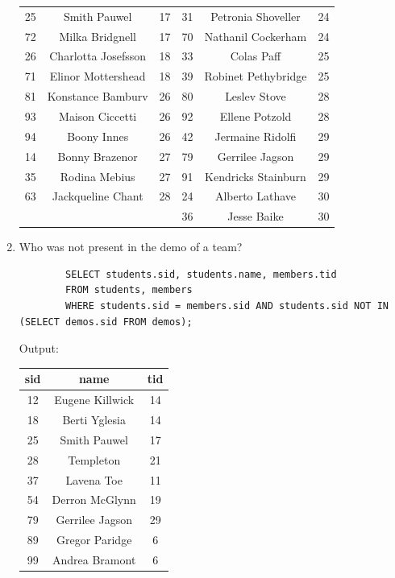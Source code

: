 \documentclass[11pt,letterpaper]{article}
\begin{document}
\begin{enumerate}
\begin{center}
\begin{tabular}{ | c  c  c |  c c c | }
				25 & Smith Pauwel & 17 & 31 & Petronia Shoveller & 24 \\
				72 & Milka Bridgnell & 17 & 70 & Nathanil Cockerham & 24 \\
				26 & Charlotta Josefsson & 18 & 33 & Colas Paff & 25 \\
				71 & Elinor Mottershead & 18 & 39 & Robinet Pethybridge & 25 \\
				\hline
				\hline
				81 & Konstance Bamburv & 26 & 80 & Leslev Stove & 28 \\
				93 & Maison Ciccetti & 26 & 92 & Ellene Potzold & 28 \\
				94 & Boony Innes & 26 & 42 & Jermaine Ridolfi & 29 \\
				14 & Bonny Brazenor & 27 & 79 & Gerrilee Jagson & 29 \\
				35 & Rodina Mebius & 27 & 91 & Kendricks Stainburn & 29 \\
				63 & Jackqueline Chant & 28 & 24 & Alberto Lathave & 30 \\
				& & & 36 & Jesse Baike & 30 \\
				\hline
			\end{tabular}
		\end{center}
		
		\item Who was not present in the demo of a team?
		
		\begin{verbatim}
		SELECT students.sid, students.name, members.tid
		FROM students, members
		WHERE students.sid = members.sid AND students.sid NOT IN (SELECT demos.sid FROM demos);
		\end{verbatim}
		Output:
		\begin{center}
			\begin{tabular}{ | c  c  c | }
				\hline
				sid & name & tid \\
				\hline
				12 & Eugene Killwick & 14 \\
				18 & Berti Yglesia & 14 \\
				25 & Smith Pauwel & 17 \\
				28 & Templeton & 21 \\
				37 & Lavena Toe & 11 \\
				54 & Derron McGlynn & 19 \\
				79 & Gerrilee Jagson & 29 \\
				89 & Gregor Paridge & 6 \\
				99 & Andrea Bramont & 6 \\
				\hline
			\end{tabular}
		\end{center}
		

\end{enumerate}
\end{document}
